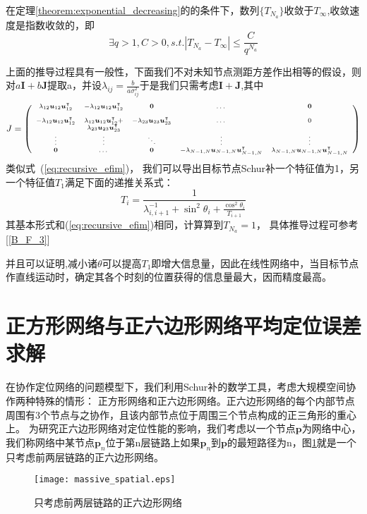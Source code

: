 \begin{corollary}\label{corollary:exponential_decreasing}
在定理\ref{theorem:exponential_decreasing}的的条件下，数列$\{T_{N_a}\}$收敛于$T_{\infty}$,收敛速度是指数收敛的，即\[
\exists q>1,C>0,s.t. |T_{N_a}-T_{\infty}|\leq\frac{C}{q^{N_a}}
\]
\end{corollary}
上面的推导过程具有一般性，下面我们不对未知节点测距方差作出相等的假设，则对$a\bm{I}+b\bm{J}$提取a，并设$\lambda_{ij}=\frac{b}{a\sigma_{ij}^2}$于是我们只需考虑$\bm{I}+\bm{J}$,其中
\[\scriptsize{
J=\left(
\begin{array}{ccccc}
\lambda_{12}\bm{u}_{12}\bm{u}_{12}^\intercal &-\lambda_{12}\bm{u}_{12}\bm{u}_{12}^\intercal &\bm{0}&\dots&\bm{0}\\
&&&&\\
-\lambda_{12}\bm{u}_{12}\bm{u}_{12}^\intercal &\lambda_{12}\bm{u}_{12}\bm{u}_{12}^\intercal +&-\lambda_{23}\bm{u}_{23}\bm{u}_{23}^\intercal &\dots&0\\
&\lambda_{23}\bm{u}_{23}\bm{u}_{23}^\intercal &&&\\
\vdots &\vdots&\ddots &\vdots&\vdots\\
\bm{0}&\dots&\bm{0}&-\lambda_{N-1,N}\bm{u}_{N-1,N}\bm{u}_{N-1,N}^\intercal &\lambda_{N-1,N}\bm{u}_{N-1,N}\bm{u}_{N-1,N}^\intercal \\
\end{array}
\right)}
\]
类似式~(\ref{eq:recursive_efim})，
我们可以导出目标节点Schur补一个特征值为1，另一个特征值$T_1$满足下面的递推关系式：
\begin{equation}\label{eq:recursive_efim_second}
  T_i=\frac{1}{\lambda_{i,i+1}^{-1}+\sin^2\theta_i+\frac{\cos^2\theta_i}{T_{i+1}}}
\end{equation}
其基本形式和(\ref{eq:recursive_efim})相同，计算算到$T_{N_a}=1$，
具体推导过程可参考[\ref{B_F_3}]

并且可以证明,减小诸$\theta$可以提高$T_1$即增大信息量，因此在线性网络中，当目标节点作直线运动时，确定其各个时刻的位置获得的信息量最大，因而精度最高。
\section{正方形网络与正六边形网络平均定位误差求解}\label{section:square_and_hexagon_network}
在协作定位网络的问题模型下，我们利用Schur补的数学工具，考虑大规模空间协作两种特殊的情形：
正方形网络和正六边形网络。正六边形网络的每个内部节点周围有3个节点与之协作，且该内部节点位于周围三个节点构成的正三角形的重心上。
为研究正六边形网络对定位性能的影响，我们考虑以一个节点$\bm{p}$为网络中心，我们称网络中某节点$\bm{p}_n$位于第n层链路上如果$\bm{p}_n$到$\bm{p}$的最短路径为n，图\ref{HexagonNetwork}就是一个只考虑前两层链路的正六边形网络。
\begin{figure}[h]
  \centering
  \texttt{[image: massive\_spatial.eps]}
  \caption{只考虑前两层链路的正六边形网络}\label{HexagonNetwork}
\end{figure}

